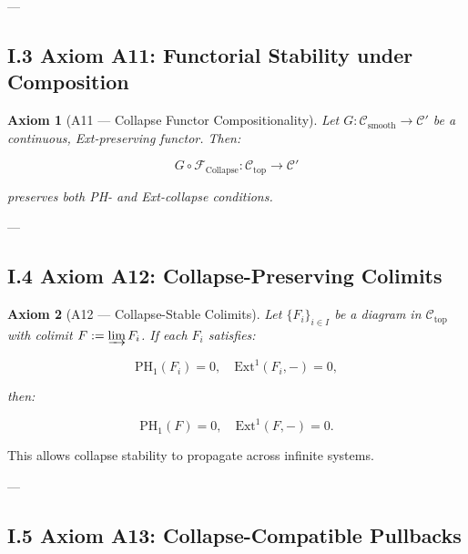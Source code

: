 \documentclass[11pt]{article}
\newtheorem{axiom}{Axiom}[section]
\begin{document}
---

\subsection*{I.3 Axiom A11: Functorial Stability under Composition}

\begin{axiom}[A11 — Collapse Functor Compositionality]
Let $G : \mathcal{C}_{\mathrm{smooth}} \to \mathcal{C}'$ be a continuous, Ext-preserving functor. Then:

\[
G \circ \mathcal{F}_{\mathrm{Collapse}} : \mathcal{C}_{\mathrm{top}} \to \mathcal{C}'
\]

preserves both PH- and Ext-collapse conditions.
\end{axiom}

\begin{center}
\end{center}

---

\subsection*{I.4 Axiom A12: Collapse-Preserving Colimits}

\begin{axiom}[A12 — Collapse-Stable Colimits]
Let $\{F_i\}_{i \in I}$ be a diagram in $\mathcal{C}_{\mathrm{top}}$ with colimit $F := \varinjlim F_i$. If each $F_i$ satisfies:

\[
\mathrm{PH}_1(F_i) = 0, \quad \mathrm{Ext}^1(F_i, -) = 0,
\]

then:

\[
\mathrm{PH}_1(F) = 0, \quad \mathrm{Ext}^1(F, -) = 0.
\]
\end{axiom}

This allows collapse stability to propagate across infinite systems.

---

\subsection*{I.5 Axiom A13: Collapse-Compatible Pullbacks}
\end{document}
